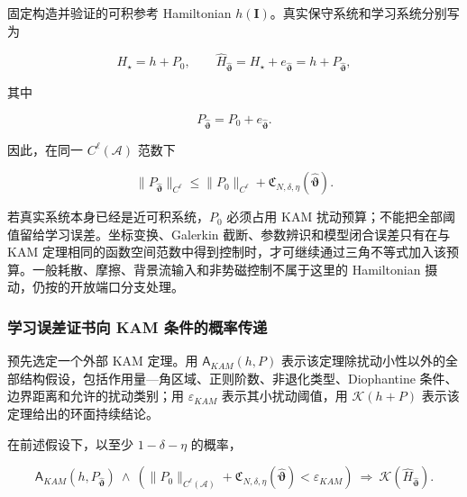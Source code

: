 固定构造并验证的可积参考 Hamiltonian \(h\left( \mathbf{I} \right)\)。真实保守系统和学习系统分别写为

\begin{equation}
\label{eq:chnn-4-55}
H_{\star} = h + P_{0},\quad\quad{\widehat{H}}_{\widehat{\bm{\vartheta}}} = H_{\star} + e_{\widehat{\bm{\vartheta}}} = h + P_{\widehat{\bm{\vartheta}}},
\end{equation}

其中

\begin{equation}
\label{eq:chnn-4-56}
P_{\widehat{\bm{\vartheta}}} = P_{0} + e_{\widehat{\bm{\vartheta}}}.
\end{equation}

因此，在同一 \(C^{\ell}\left( \mathcal{A} \right)\) 范数下

\begin{equation}
\label{eq:chnn-4-57}
\left. \parallel P_{\widehat{\bm{\vartheta}}} \right.\parallel_{C^{\ell}} \leq \left. \parallel P_{0} \right.\parallel_{C^{\ell}} + \mathfrak{C}_{N,\delta,\eta}\left( \widehat{\bm{\vartheta}} \right).
\end{equation}

若真实系统本身已经是近可积系统，\(P_{0}\) 必须占用 KAM 扰动预算；不能把全部阈值留给学习误差。坐标变换、Galerkin 截断、参数辨识和模型闭合误差只有在与 KAM 定理相同的函数空间范数中得到控制时，才可继续通过三角不等式加入该预算。一般耗散、摩擦、背景流输入和非势磁控制不属于这里的 Hamiltonian 摄动，仍按的开放端口分支处理。

\subsubsection{学习误差证书向 KAM 条件的概率传递}\label{sec:chnn-4-6-7}

预先选定一个外部 KAM 定理。用 \(\mathsf{A}_{KAM}(h,P)\) 表示该定理除扰动小性以外的全部结构假设，包括作用量---角区域、正则阶数、非退化类型、Diophantine 条件、边界距离和允许的扰动类别；用 \(\varepsilon_{KAM}\) 表示其小扰动阈值，用 \(\mathcal{K}(h + P)\) 表示该定理给出的环面持续结论。

\begin{proposition}[概率传递]\label{prop:kam-probability-transfer}
在前述假设下，以至少 \(1 - \delta - \eta\) 的概率，

\begin{equation}
\label{eq:chnn-4-58}
\boxed{\mathsf{A}_{KAM}\left( h,P_{\widehat{\bm{\vartheta}}} \right)\  \land \ \left( \left. \parallel P_{0} \right.\parallel_{C^{\ell}\left( \mathcal{A} \right)} + \mathfrak{C}_{N,\delta,\eta}\left( \widehat{\bm{\vartheta}} \right) < \varepsilon_{KAM} \right)\  \Rightarrow \ \mathcal{K}\left( {\widehat{H}}_{\widehat{\bm{\vartheta}}} \right).}
\end{equation}
\end{proposition}

